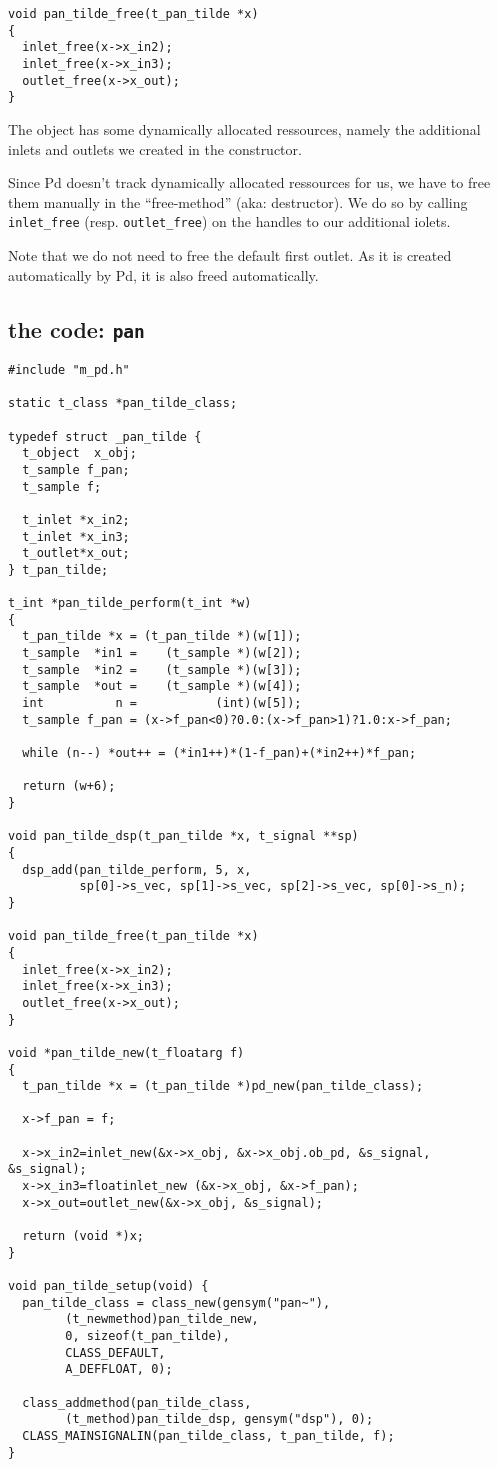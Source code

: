 \documentclass[12pt, a4paper,english,titlepage]{article}
\begin{document}
\begin{verbatim}
void pan_tilde_free(t_pan_tilde *x)
{
  inlet_free(x->x_in2);
  inlet_free(x->x_in3);
  outlet_free(x->x_out);
}
\end{verbatim}

The object has some dynamically allocated ressources,
namely the additional inlets and outlets we created in the constructor.

Since Pd doesn't track dynamically allocated ressources for us,
we have to free them manually in the ``free-method'' (aka: destructor).
We do so by calling \verb+inlet_free+ (resp. \verb+outlet_free+) on the handles to
our additional iolets.

Note that we do not need to free the default first outlet.
As it is created automatically by Pd, it is also freed automatically.

\subsection{the code: \tt pan\pdtilde}

\begin{verbatim}
#include "m_pd.h"

static t_class *pan_tilde_class;

typedef struct _pan_tilde {
  t_object  x_obj;
  t_sample f_pan;
  t_sample f;

  t_inlet *x_in2;
  t_inlet *x_in3;
  t_outlet*x_out;
} t_pan_tilde;

t_int *pan_tilde_perform(t_int *w)
{
  t_pan_tilde *x = (t_pan_tilde *)(w[1]);
  t_sample  *in1 =    (t_sample *)(w[2]);
  t_sample  *in2 =    (t_sample *)(w[3]);
  t_sample  *out =    (t_sample *)(w[4]);
  int          n =           (int)(w[5]);
  t_sample f_pan = (x->f_pan<0)?0.0:(x->f_pan>1)?1.0:x->f_pan;

  while (n--) *out++ = (*in1++)*(1-f_pan)+(*in2++)*f_pan;

  return (w+6);
}

void pan_tilde_dsp(t_pan_tilde *x, t_signal **sp)
{
  dsp_add(pan_tilde_perform, 5, x,
          sp[0]->s_vec, sp[1]->s_vec, sp[2]->s_vec, sp[0]->s_n);
}

void pan_tilde_free(t_pan_tilde *x)
{
  inlet_free(x->x_in2);
  inlet_free(x->x_in3);
  outlet_free(x->x_out);
}

void *pan_tilde_new(t_floatarg f)
{
  t_pan_tilde *x = (t_pan_tilde *)pd_new(pan_tilde_class);

  x->f_pan = f;
  
  x->x_in2=inlet_new(&x->x_obj, &x->x_obj.ob_pd, &s_signal, &s_signal);
  x->x_in3=floatinlet_new (&x->x_obj, &x->f_pan);
  x->x_out=outlet_new(&x->x_obj, &s_signal);

  return (void *)x;
}

void pan_tilde_setup(void) {
  pan_tilde_class = class_new(gensym("pan~"),
        (t_newmethod)pan_tilde_new,
        0, sizeof(t_pan_tilde),
        CLASS_DEFAULT, 
        A_DEFFLOAT, 0);

  class_addmethod(pan_tilde_class,
        (t_method)pan_tilde_dsp, gensym("dsp"), 0);
  CLASS_MAINSIGNALIN(pan_tilde_class, t_pan_tilde, f);
}
\end{verbatim}
\end{document}
